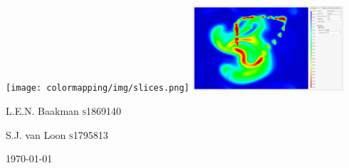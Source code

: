 \begin{titlepage}
        \vspace{10px}
        \texttt{[image: colormapping/img/slices.png]} \hspace{10px}
        \includegraphics[width=0.42\textwidth, height=0.5\textheight, keepaspectratio=true]{colormapping/img/clamped_01.png}        
    \vspace{2cm}\par

    {\Large L.E.N. Baakman \textsc{s}1869140\par}
    {\Large S.J. van Loon \textsc{s}1795813\par}

    \vfill
    {\large \today\par}
\end{titlepage}
\hypersetup{pageanchor=true}